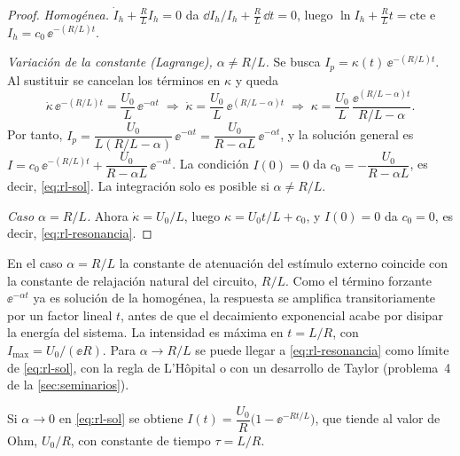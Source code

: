\begin{proof}
\emph{Homogénea.} $\dot I_h+\frac RL I_h=0$ da $\dd I_h/I_h+\frac RL\,\dd t=0$, luego $\ln I_h+\frac RL t=\text{cte}$ e $I_h=c_0\,\ee^{-(R/L)t}$.

\emph{Variación de la constante (Lagrange), $\alpha\neq R/L$.} Se busca $I_p=\kappa(t)\,\ee^{-(R/L)t}$. Al sustituir se cancelan los términos en $\kappa$ y queda
\[
  \dot\kappa\,\ee^{-(R/L)t}=\frac{U_0}{L}\,\ee^{-\alpha t}
  \;\Longrightarrow\;
  \dot\kappa=\frac{U_0}{L}\,\ee^{(R/L-\alpha)t}
  \;\Longrightarrow\;
  \kappa=\frac{U_0}{L}\,\frac{\ee^{(R/L-\alpha)t}}{R/L-\alpha}.
\]
Por tanto, $I_p=\dfrac{U_0}{L(R/L-\alpha)}\,\ee^{-\alpha t}=\dfrac{U_0}{R-\alpha L}\,\ee^{-\alpha t}$, y la solución general es $I=c_0\,\ee^{-(R/L)t}+\dfrac{U_0}{R-\alpha L}\,\ee^{-\alpha t}$. La condición $I(0)=0$ da $c_0=-\dfrac{U_0}{R-\alpha L}$, es decir, \eqref{eq:rl-sol}. La integración solo es posible si $\alpha\neq R/L$.

\emph{Caso $\alpha=R/L$.} Ahora $\dot\kappa=U_0/L$, luego $\kappa=U_0t/L+c_0$, y $I(0)=0$ da $c_0=0$, es decir, \eqref{eq:rl-resonancia}.
\end{proof}

\begin{remark}[resonancia]
En el caso $\alpha=R/L$ la constante de atenuación del estímulo externo coincide con la constante de relajación natural del circuito, $R/L$. Como el término forzante $\ee^{-\alpha t}$ ya es solución de la homogénea, la respuesta se amplifica transitoriamente por un factor lineal $t$, antes de que el decaimiento exponencial acabe por disipar la energía del sistema. La intensidad es máxima en $t=L/R$, con $I_{\mathrm{max}}=U_0/(\ee R)$. Para $\alpha\to R/L$ se puede llegar a \eqref{eq:rl-resonancia} como límite de \eqref{eq:rl-sol}, con la regla de L'Hôpital o con un desarrollo de Taylor (problema~4 de la \cref{sec:seminarios}).
\end{remark}

\begin{remark}
Si $\alpha\to0$ en \eqref{eq:rl-sol} se obtiene $I(t)=\dfrac{U_0}{R}\bigl(1-\ee^{-Rt/L}\bigr)$, que tiende al valor de Ohm, $U_0/R$, con constante de tiempo $\tau=L/R$.
\end{remark}

